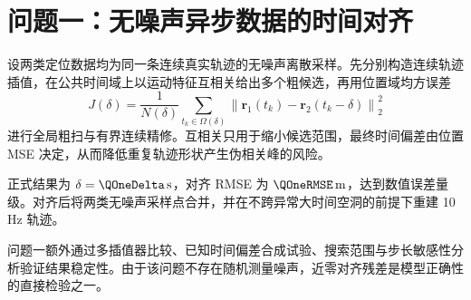 \section{问题一：无噪声异步数据的时间对齐}

设两类定位数据均为同一条连续真实轨迹的无噪声离散采样。先分别构造连续轨迹插值，在公共时间域上以运动特征互相关给出多个粗候选，再用位置域均方误差
\begin{equation}
J(\delta)=\frac{1}{N(\delta)}\sum_{t_k\in\Omega(\delta)}
\left\|\bm r_1(t_k)-\bm r_2(t_k-\delta)\right\|_2^2
\end{equation}
进行全局粗扫与有界连续精修。互相关只用于缩小候选范围，最终时间偏差由位置 MSE 决定，从而降低重复轨迹形状产生伪相关峰的风险。

正式结果为 $\delta=\QOneDelta\,\mathrm{s}$，对齐 RMSE 为 $\QOneRMSE\,\mathrm{m}$，达到数值误差量级。对齐后将两类无噪声采样点合并，并在不跨异常大时间空洞的前提下重建 10 Hz 轨迹。

问题一额外通过多插值器比较、已知时间偏差合成试验、搜索范围与步长敏感性分析验证结果稳定性。由于该问题不存在随机测量噪声，近零对齐残差是模型正确性的直接检验之一。
